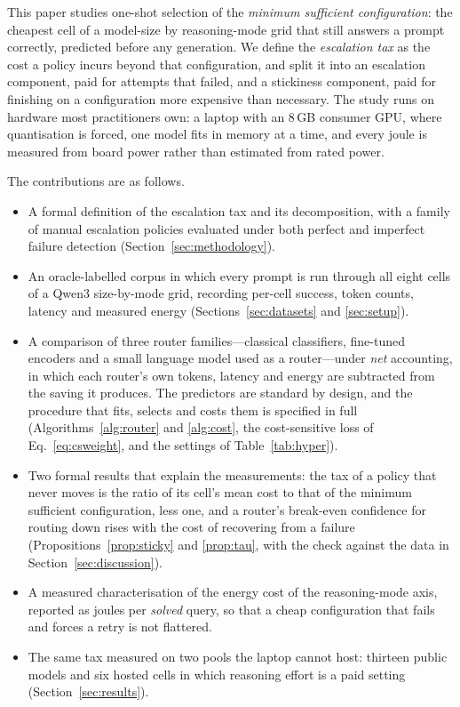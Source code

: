This paper studies one-shot selection of the \emph{minimum sufficient
configuration}: the cheapest cell of a model-size by reasoning-mode grid that
still answers a prompt correctly, predicted before any generation. We define
the \emph{escalation tax} as the cost a policy incurs beyond that
configuration, and split it into an escalation component, paid for attempts
that failed, and a stickiness component, paid for finishing on a
configuration more expensive than necessary. The study runs on hardware most
practitioners own: a laptop with an 8\,GB consumer GPU, where quantisation is
forced, one model fits in memory at a time, and every joule is measured from
board power rather than estimated from rated power.

The contributions are as follows.
\begin{itemize}
  \item A formal definition of the escalation tax and its decomposition, with
        a family of manual escalation policies evaluated under both perfect
        and imperfect failure detection (Section~\ref{sec:methodology}).
  \item An oracle-labelled corpus in which every prompt is run through all
        eight cells of a Qwen3 size-by-mode grid, recording per-cell success,
        token counts, latency and measured energy
        (Sections~\ref{sec:datasets} and \ref{sec:setup}).
  \item A comparison of three router families---classical classifiers,
        fine-tuned encoders and a small language model used as a
        router---under \emph{net} accounting, in which each router's own
        tokens, latency and energy are subtracted from the saving it
        produces. The predictors are standard by design, and the
        procedure that fits, selects and costs them is specified in full
        (Algorithms~\ref{alg:router} and \ref{alg:cost}, the
        cost-sensitive loss of Eq.~\eqref{eq:csweight}, and the settings of
        Table~\ref{tab:hyper}).
  \item Two formal results that explain the measurements: the tax of a
        policy that never moves is the ratio of its cell's mean cost to that
        of the minimum sufficient configuration, less one, and a router's
        break-even confidence for routing down rises with the cost of
        recovering from a failure (Propositions~\ref{prop:sticky} and
        \ref{prop:tau}, with the check against the data in
        Section~\ref{sec:discussion}).
  \item A measured characterisation of the energy cost of the reasoning-mode
        axis, reported as joules per \emph{solved} query, so that a cheap
        configuration that fails and forces a retry is not flattered.
  \item The same tax measured on two pools the laptop cannot host: thirteen
        public models and six hosted cells in which reasoning effort is a
        paid setting (Section~\ref{sec:results}).
\end{itemize}

